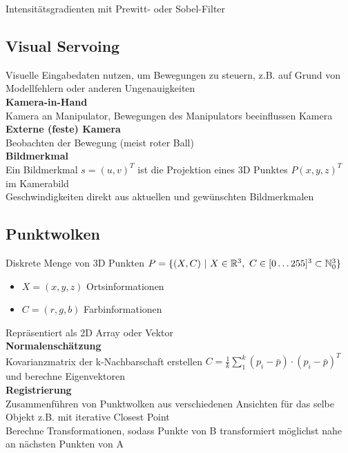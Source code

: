 Intensitätsgradienten mit Prewitt- oder Sobel-Filter

\subsection{Visual Servoing}
Visuelle Eingabedaten nutzen, um Bewegungen zu steuern, z.B. auf Grund von Modellfehlern oder anderen Ungenauigkeiten\\

\textbf{Kamera-in-Hand}\\
Kamera an Manipulator, Bewegungen des Manipulators beeinflussen Kamera\\

\textbf{Externe (feste) Kamera}\\
Beobachten der Bewegung (meist roter Ball)\\

\textbf{Bildmerkmal}\\
Ein Bildmerkmal \(s = (u,v)^T\) ist die Projektion eines 3D Punktes \(P (x, y, z)^T\) im Kamerabild\\
Geschwindigkeiten direkt aus aktuellen und gewünschten Bildmerkmalen\\

\subsection{Punktwolken}
Diskrete Menge von 3D Punkten \(P = \{(X, C)\ |\ X \in \mathbb{R}^3,\ C \in [0 \ldots 255]^3 \subset \mathbb{N}^3_0\}\)
\begin{itemize}
\item \(X = (x, y, z)\) Ortsinformationen
\item \(C = (r, g, b)\) Farbinformationen
\end{itemize}
Repräsentiert als 2D Array oder Vektor\\

\textbf{Normalenschätzung}\\
Kovarianzmatrix der k-Nachbarschaft erstellen \(C = \frac{1}{k} \sum_1^k (p_i - \bar{p}) \cdot (p_i - \bar{p})^T\)
und berechne Eigenvektoren\\

\textbf{Registrierung}\\
Zusammenführen von Punktwolken aus verschiedenen Ansichten für das selbe Objekt
z.B. mit iterative Closest Point\\
Berechne Transformationen, sodass Punkte von B transformiert möglichst nahe an nächsten Punkten von A \\

